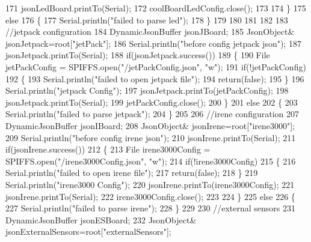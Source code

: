 \begin{DoxyCode}
171         jsonLedBoard.printTo(Serial);
172         coolBoardLedConfig.close();
173     
174     \}
175     \textcolor{keywordflow}{else}
176     \{
177         Serial.println(\textcolor{stringliteral}{"failed to parse led"});
178     \}
179         
180 
181     
182 
183     \textcolor{comment}{//jetpack configuration}
184     DynamicJsonBuffer jsonJBoard;
185         JsonObject& jsonJetpack=root[\textcolor{stringliteral}{"jetPack"}];
186     Serial.println(\textcolor{stringliteral}{"before config jetpack json"});
187     jsonJetpack.printTo(Serial);
188     \textcolor{keywordflow}{if}(jsonJetpack.success())
189     \{   
190         File jetPackConfig = SPIFFS.open(\textcolor{stringliteral}{"/jetPackConfig.json"}, \textcolor{stringliteral}{"w"});   
191         \textcolor{keywordflow}{if}(!jetPackConfig)
192         \{
193             Serial.println(\textcolor{stringliteral}{"failed to open jetpack file"});
194             \textcolor{keywordflow}{return}(\textcolor{keyword}{false});
195         \}
196         Serial.println(\textcolor{stringliteral}{"jetpack Config"});   
197         jsonJetpack.printTo(jetPackConfig);
198         jsonJetpack.printTo(Serial);
199         jetPackConfig.close();
200     \}
201     \textcolor{keywordflow}{else}
202     \{
203         Serial.println(\textcolor{stringliteral}{"failed to parse jetpack"});  
204     \}
205     
206     \textcolor{comment}{//irene configuration   }
207     DynamicJsonBuffer jsonIBoard;
208         JsonObject& jsonIrene=root[\textcolor{stringliteral}{"irene3000"}];
209     Serial.println(\textcolor{stringliteral}{"before config irene json"}); 
210     jsonIrene.printTo(Serial);
211     \textcolor{keywordflow}{if}(jsonIrene.success())
212     \{
213         File irene3000Config = SPIFFS.open(\textcolor{stringliteral}{"/irene3000Config.json"}, \textcolor{stringliteral}{"w"});   
214         \textcolor{keywordflow}{if}(!irene3000Config)
215         \{
216             Serial.println(\textcolor{stringliteral}{"failed to open irene file"});
217             \textcolor{keywordflow}{return}(\textcolor{keyword}{false});
218         \}
219         Serial.println(\textcolor{stringliteral}{"irene3000 Config"});
220         jsonIrene.printTo(irene3000Config);
221         jsonIrene.printTo(Serial);
222         irene3000Config.close();
223     
224     \}
225     \textcolor{keywordflow}{else}
226     \{
227         Serial.println(\textcolor{stringliteral}{"failed to parse irene"});    
228     \}
229     
230     \textcolor{comment}{//external sensors}
231     DynamicJsonBuffer jsonESBoard;
232         JsonObject& jsonExternalSensors=root[\textcolor{stringliteral}{"externalSensors"}];

\end{DoxyCode}
